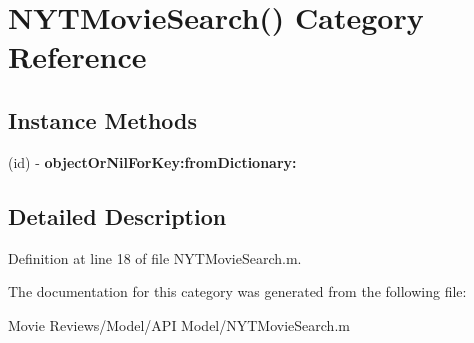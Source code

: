 \section{N\+Y\+T\+Movie\+Search() Category Reference}
\label{category_n_y_t_movie_search_07_08}
\subsection*{Instance Methods}
\begin{DoxyCompactItemize}
\item 
(id) -\/ {\bfseries object\+Or\+Nil\+For\+Key\+:from\+Dictionary\+:}\label{category_n_y_t_movie_search_07_08_a11460b53e841c7d1e0c49403ca0158db}

\end{DoxyCompactItemize}


\subsection{Detailed Description}


Definition at line 18 of file N\+Y\+T\+Movie\+Search.\+m.



The documentation for this category was generated from the following file\+:\begin{DoxyCompactItemize}
\item 
Movie Reviews/\+Model/\+A\+P\+I Model/N\+Y\+T\+Movie\+Search.\+m\end{DoxyCompactItemize}
